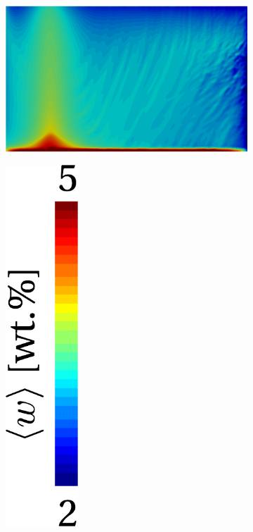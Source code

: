 \begin{figure}[htbp]
\centering
  \begin{subfigure}[t]{0.4\textwidth}
    \centering
  \includegraphics[width=\textwidth]{Chapter5/Graphics/2d/ref_7000s_nosliptop.png}
  \caption{}
    \label{fig:noslip7000}
  \end{subfigure}
  \begin{subfigure}[t]{0.15\textwidth}
    \centering
  \includegraphics[width=0.3\textwidth]{Chapter5/Graphics/2d/colorbar.pdf}

\end{subfigure}
\end{figure}
